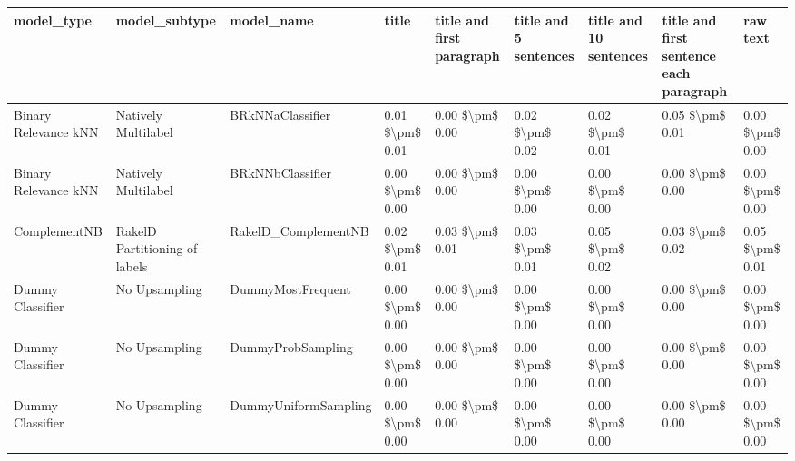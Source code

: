 \begin{tabular}{lllllllll}
\toprule
                     model\_type &                 model\_subtype &                                   model\_name &           title & title and first paragraph & title and 5 sentences & title and 10 sentences & title and first sentence each paragraph &            raw text \\
\midrule
           Binary Relevance kNN &           Natively Multilabel &                             BRkNNaClassifier & 0.01 \$\textbackslash pm\$ 0.01 &           0.00 \$\textbackslash pm\$ 0.00 &       0.02 \$\textbackslash pm\$ 0.02 &        0.02 \$\textbackslash pm\$ 0.01 &                         0.05 \$\textbackslash pm\$ 0.01 &     0.00 \$\textbackslash pm\$ 0.00 \\
           Binary Relevance kNN &           Natively Multilabel &                             BRkNNbClassifier & 0.00 \$\textbackslash pm\$ 0.00 &           0.00 \$\textbackslash pm\$ 0.00 &       0.00 \$\textbackslash pm\$ 0.00 &        0.00 \$\textbackslash pm\$ 0.00 &                         0.00 \$\textbackslash pm\$ 0.00 &     0.00 \$\textbackslash pm\$ 0.00 \\
                   ComplementNB & RakelD Partitioning of labels &                          RakelD\_ComplementNB & 0.02 \$\textbackslash pm\$ 0.01 &           0.03 \$\textbackslash pm\$ 0.01 &       0.03 \$\textbackslash pm\$ 0.01 &        0.05 \$\textbackslash pm\$ 0.02 &                         0.03 \$\textbackslash pm\$ 0.02 &     0.05 \$\textbackslash pm\$ 0.01 \\
               Dummy Classifier &                 No Upsampling &                            DummyMostFrequent & 0.00 \$\textbackslash pm\$ 0.00 &           0.00 \$\textbackslash pm\$ 0.00 &       0.00 \$\textbackslash pm\$ 0.00 &        0.00 \$\textbackslash pm\$ 0.00 &                         0.00 \$\textbackslash pm\$ 0.00 &     0.00 \$\textbackslash pm\$ 0.00 \\
               Dummy Classifier &                 No Upsampling &                            DummyProbSampling & 0.00 \$\textbackslash pm\$ 0.00 &           0.00 \$\textbackslash pm\$ 0.00 &       0.00 \$\textbackslash pm\$ 0.00 &        0.00 \$\textbackslash pm\$ 0.00 &                         0.00 \$\textbackslash pm\$ 0.00 &     0.00 \$\textbackslash pm\$ 0.00 \\
               Dummy Classifier &                 No Upsampling &                         DummyUniformSampling & 0.00 \$\textbackslash pm\$ 0.00 &           0.00 \$\textbackslash pm\$ 0.00 &       0.00 \$\textbackslash pm\$ 0.00 &        0.00 \$\textbackslash pm\$ 0.00 &                         0.00 \$\textbackslash pm\$ 0.00 &     0.00 \$\textbackslash pm\$ 0.00 \\

\end{tabular}
